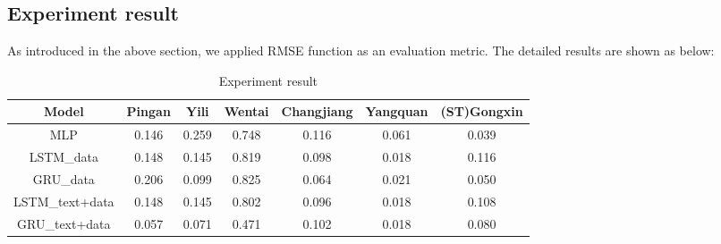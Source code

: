 \documentclass[runningheads]{llncs}
\begin{document}
\subsection{Experiment result}
As introduced in the above section, we applied RMSE function as an evaluation metric. The detailed results are shown as below:
\begin{table}
    \renewcommand\arraystretch{1.2}
	\centering\caption{Experiment result}\label{tab:RMSE}
    \begin{tabular}{|c|c|c|c|c|c|c|}
        \hline
        Model&Pingan&Yili&Wentai&Changjiang&Yangquan&(ST)Gongxin\\\hline\hline
        MLP&0.146&0.259&0.748&0.116&0.061&0.039\\\hline
        LSTM\_data& 0.148 & 0.145 & 0.819 & 0.098 & 0.018 & 0.116 \\\hline
        GRU\_data&0.206&0.099&0.825& 0.064& 0.021& 0.050\\\hline
        LSTM\_text+data& 0.148& 0.145& 0.802& 0.096& 0.018& 0.108\\\hline
        GRU\_text+data & 0.057& 0.071& 0.471& 0.102& 0.018& 0.080\\\hline
    \end{tabular}
\end{table}
\end{document}
